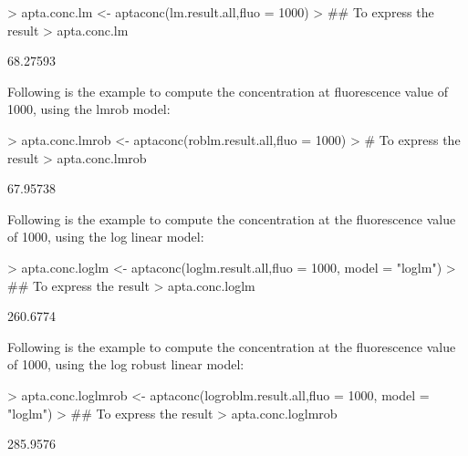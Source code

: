 \documentclass[11pt]{article}
\begin{document}
\begin{Schunk}
\begin{Sinput}
> apta.conc.lm <- aptaconc(lm.result.all,fluo = 1000)
> ## To express the result
> apta.conc.lm
\end{Sinput}
\begin{Soutput}
[1] 68.27593
\end{Soutput}
\end{Schunk}


Following is the example to compute the concentration at fluorescence value of 1000, using the lmrob
model:
\begin{Schunk}
\begin{Sinput}
> apta.conc.lmrob <- aptaconc(roblm.result.all,fluo = 1000)
> # To express the result
> apta.conc.lmrob
\end{Sinput}
\begin{Soutput}
[1] 67.95738
\end{Soutput}
\end{Schunk}


Following is the example to compute the concentration at the fluorescence value of 1000, using the
log linear model:
\begin{Schunk}
\begin{Sinput}
> apta.conc.loglm <- aptaconc(loglm.result.all,fluo = 1000, model = "loglm")
> ## To express the result
> apta.conc.loglm
\end{Sinput}
\begin{Soutput}
[1] 260.6774
\end{Soutput}
\end{Schunk}


Following is the example to compute the concentration at the fluorescence value of 1000, using the
log robust linear model:
\begin{Schunk}
\begin{Sinput}
> apta.conc.loglmrob <- aptaconc(logroblm.result.all,fluo = 1000, model = "loglm")
> ## To express the result
> apta.conc.loglmrob
\end{Sinput}
\begin{Soutput}
[1] 285.9576
\end{Soutput}
\end{Schunk}


\end{document}

